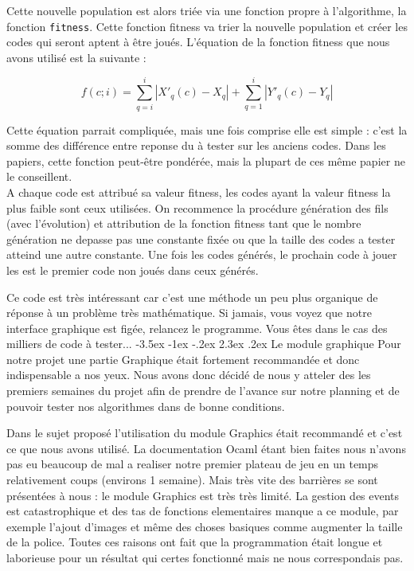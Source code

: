 \documentclass[11pt, a4paper]{article}
\makeatletter
\renewcommand{\section}{\@startsection{section}{1}{\z@}%
          {-3.5ex \@plus -1ex \@minus -.2ex}%
          {2.3ex \@plus .2ex}%
          {\reset@font\Large\bfseries	}}
\makeatother
\begin{document}
\vspace{3  mm}


Cette nouvelle population est alors triée via une fonction propre à l'algorithme, la fonction \texttt{fitness}. 
Cette fonction fitness va trier la nouvelle population et créer les codes qui seront aptent à être joués.
L'équation de la fonction fitness que nous avons utilisé est la suivante :

\begin{equation}
f(c;i)=\sum_{q=i}^i |X'_q(c) - X_q| + \sum_{q=1}^i |Y'_q(c) - Y_q|
\end{equation}

Cette équation parrait compliquée, mais une fois comprise elle est simple : c'est la somme des différence entre reponse du à tester sur les anciens codes.
 Dans les papiers, cette fonction peut-être pondérée, mais la plupart de ces même papier ne le conseillent. \\
A chaque code est attribué sa valeur fitness, les codes ayant la valeur fitness la plus faible sont ceux utilisées. 
On recommence la procédure génération des fils (avec l'évolution) et attribution de la fonction fitness tant que le nombre génération ne depasse pas une constante 
fixée ou que la taille des codes a tester atteind une autre constante. \newline
Une fois les codes générés, le prochain code à jouer les est le premier code non joués dans ceux générés.

\vspace{3  mm}

Ce code est très intéressant car c'est une méthode un peu plus organique de réponse à un problème très mathématique. Si jamais, vous voyez que notre interface graphique est figée,
relancez le programme. Vous êtes dans le cas des milliers de code à tester... 
\newpage
\section{Le module graphique} 
Pour notre projet une partie Graphique était fortement recommandée et donc indispensable a nos yeux. 
Nous avons donc décidé de nous y atteler des les premiers semaines du projet afin de prendre de l’avance sur notre planning et de pouvoir tester nos algorithmes dans de bonne conditions.

\vspace{3  mm}

Dans le sujet proposé l’utilisation du module Graphics était recommandé et c’est ce que nous avons utilisé. 
La documentation Ocaml étant bien faites nous n’avons pas eu beaucoup de mal a realiser notre premier plateau de jeu en un temps relativement coups (environs 1 semaine). 
Mais très vite des barrières se sont présentées à nous : le module Graphics est très très limité. 
La gestion des events est catastrophique et des tas de fonctions elementaires manque a ce module, par exemple l’ajout d’images et même des choses basiques 
comme augmenter la taille de la police. Toutes ces raisons ont fait que la programmation était longue et laborieuse pour un résultat qui certes fonctionné mais ne nous correspondais pas.
\end{document}
